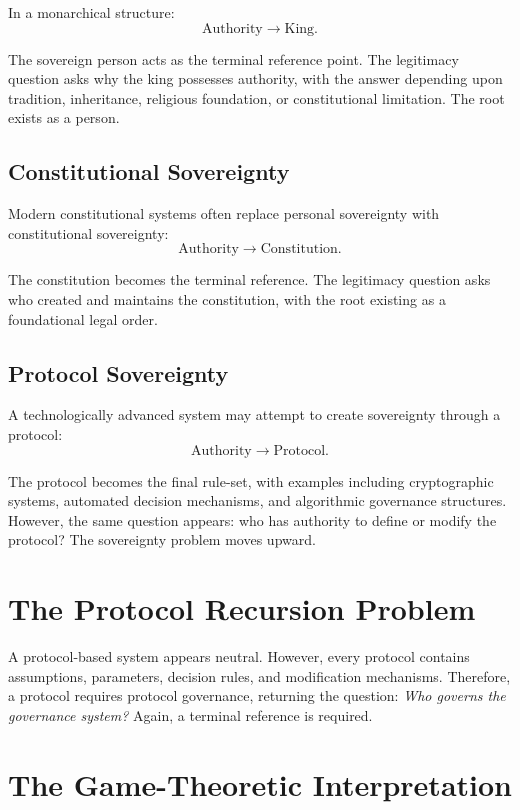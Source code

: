 \documentclass[11pt,openany]{book}
\theoremstyle{plain}
\theoremstyle{definition}
\begin{document}
In a monarchical structure:
\[
\text{Authority} \longrightarrow \text{King}.
\]

The sovereign person acts as the terminal reference point. The legitimacy question asks why the king possesses authority, with the answer depending upon tradition, inheritance, religious foundation, or constitutional limitation. The root exists as a person.

\subsection*{Constitutional Sovereignty}

Modern constitutional systems often replace personal sovereignty with constitutional sovereignty:
\[
\text{Authority} \longrightarrow \text{Constitution}.
\]

The constitution becomes the terminal reference. The legitimacy question asks who created and maintains the constitution, with the root existing as a foundational legal order.

\subsection*{Protocol Sovereignty}

A technologically advanced system may attempt to create sovereignty through a protocol:
\[
\text{Authority} \longrightarrow \text{Protocol}.
\]

The protocol becomes the final rule-set, with examples including cryptographic systems, automated decision mechanisms, and algorithmic governance structures. However, the same question appears: who has authority to define or modify the protocol? The sovereignty problem moves upward.

\section*{The Protocol Recursion Problem}

A protocol-based system appears neutral. However, every protocol contains assumptions, parameters, decision rules, and modification mechanisms. Therefore, a protocol requires protocol governance, returning the question: \textit{Who governs the governance system?} Again, a terminal reference is required.

\section*{The Game-Theoretic Interpretation}
\end{document}

